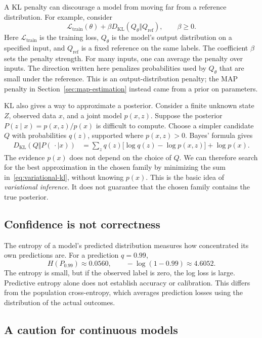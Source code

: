 A KL penalty can discourage a model from moving far from a reference
distribution. For example, consider
\[
  \mathcal L_{\mathrm{train}}(\theta)
  +\beta D_{\mathrm{KL}}(Q_\theta\Vert Q_{\mathrm{ref}}),
  \qquad \beta\ge0.
\]
Here \(\mathcal L_{\mathrm{train}}\) is the training loss,
\(Q_\theta\) is the model's output distribution on a specified input,
and \(Q_{\mathrm{ref}}\) is a fixed reference on the same labels.
The coefficient \(\beta\) sets the penalty strength. For many inputs,
one can average the penalty over inputs. The direction written here
penalizes probabilities used by \(Q_\theta\) that are small under the
reference. This is an output-distribution penalty; the MAP penalty in
Section~\ref{sec:map-estimation} instead came from a prior on parameters.

KL also gives a way to approximate a posterior. Consider a finite unknown
state \(Z\), observed data \(x\), and a joint model \(p(x,z)\).
Suppose the posterior \(P(z\mid x)=p(x,z)/p(x)\) is difficult to compute.
Choose a simpler candidate \(Q\) with probabilities \(q(z)\), supported
where \(p(x,z)>0\). Bayes' formula gives
\begin{align}
  D_{\mathrm{KL}}(Q\Vert P(\,\cdot\mid x))
  &=\sum_z q(z)\bigl[\log q(z)-\log p(x,z)\bigr]+\log p(x).
  \label{eq:variational-kl}
\end{align}
The evidence \(p(x)\) does not depend on the choice of \(Q\).
We can therefore search for the best approximation in the chosen family by
minimizing the sum in~\eqref{eq:variational-kl}, without knowing \(p(x)\).
This is the basic idea of \emph{variational inference}. It does not
guarantee that the chosen family contains the true posterior.

\subsection{Confidence is not correctness}

The entropy of a model's predicted distribution measures how concentrated
its own predictions are. For a prediction \(q=0.99\),
\[
  H(P_{0.99})\approx0.0560,
  \qquad -\log(1-0.99)\approx4.6052.
\]
The entropy is small, but if the observed label is zero, the log loss is
large. Predictive entropy alone does not establish accuracy or calibration.
This differs from the population cross-entropy, which averages prediction
losses using the distribution of the actual outcomes.

\subsection{A caution for continuous models}

